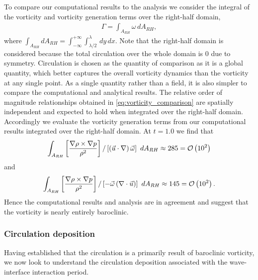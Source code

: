 To compare our computational results to the analysis we consider the
integral of the vorticity and vorticity generation terms over the
right-half domain,
\begin{align}
  \Gamma = \int_{A_{RH}} \omega \,dA_{RH},
\end{align}
where
$\int_{A_{RH}} dA_{RH} =
\int_{-\infty}^{+\infty}\int_{\lambda/2}^{\lambda} \,dy\, dx$. Note
that the right-half domain is considered because the total circulation
over the whole domain is $0$ due to symmetry. Circulation is chosen as
the quantity of comparison as it is a global quantity, which better
captures the overall vorticity dynamics than the vorticity at any
single point. As a single quantity rather than a field, it is also
simpler to compare the computational and analytical results. The
relative order of magnitude relationships obtained in
\eqref{eq:vorticity_comparison} are spatially independent and expected
to hold when integrated over the right-half domain. Accordingly we
evaluate the vorticity generation terms from our computational results
integrated over the right-half domain. At $t=1.0$ we find that %
$$ \int_{A_{RH}} \left[\frac{\nabla\rho\times\nabla p}{\rho^2}\right] / \left[\left(\vec{u}\cdot\nabla\right)\vec{\omega}\right]\,\,dA_{RH}\approx 285=\mathcal{O}\left(10^2\right)$$
and
$$ \int_{A_{RH}} \left[\frac{\nabla\rho\times\nabla p}{\rho^2}\right] / \left[-\vec{\omega}\left(\nabla\cdot\vec{u}\right)\right]\,\,dA_{RH} \approx 145=\mathcal{O}\left(10^2\right).$$%
%
Hence the computational results and analysis are in agreement and suggest
that the vorticity is nearly entirely baroclinic.
% 
% 
\subsubsection{Circulation deposition}
Having established that the circulation is a primarily result of
baroclinic vorticity, we now look to understand the circulation
deposition associated with the wave-interface interaction period.

